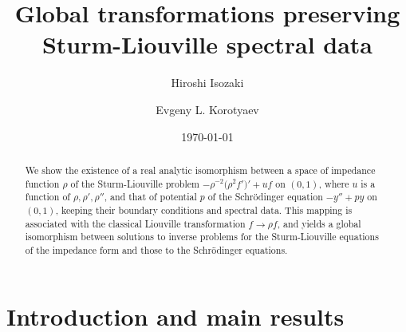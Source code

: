 \documentclass[10pt]{amsart}
\begin{document}
                 
        
\def\el2{\ell^{\,2}}             

\let\ge\geqslant
\let\le\leqslant
\let\geq\geqslant
\let\leq\leqslant

\title[{Global transformations
preserving  spectral data }]
{Global transformations
preserving  Sturm-Liouville spectral data }

\date{\today}

\author[Hiroshi Isozaki]{Hiroshi Isozaki}
\address{Institute of Mathematics,
University of Tsukuba,
Tsukuba, 305-8571, Japan,\\
\ isozakih@math.tsukuba.ac.jp}
\author[Evgeny L. Korotyaev]{Evgeny L. Korotyaev}
\address{
Mathematical Physics Department, Faculty of Physics,
St. Petersburg State University,  Ulianovskaya 2, St. Petersburg, 198904, Russia,
 \ korotyaev@gmail.com}

\subjclass{}

\begin{abstract}
We show the existence of a real  analytic isomorphism between a space of impedance function $\rho$ of the Sturm-Liouville problem $- \rho^{-2}\big(\rho^2f')' + uf$ on $(0,1)$,
where $u$ is a function of $\rho, \rho', \rho''$, and
 that of potential $p$ of the Schr{\"o}dinger equation $- y'' + py$ on $(0,1)$, keeping their boundary conditions and spectral data. This mapping is  associated with the classical Liouville transformation $f \to \rho f$, and yields a global isomorphism between solutions to  inverse problems for the Sturm-Liouville equations of the impedance form and those to the Schr{\"o}dinger equations.
\end{abstract}

\maketitle

\section {Introduction and main results}
\setcounter{equation}{0}
\end{document}
